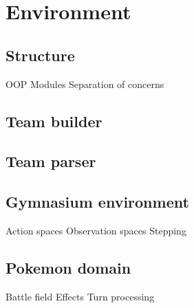 \section{Environment}
\label{sec:environment}

\subsection{Structure}
OOP
Modules
Separation of concerns

\subsection{Team builder}

\subsection{Team parser}

\subsection{Gymnasium environment}
Action spaces
Observation spaces
Stepping

\subsection{Pokemon domain}
Battle field
Effects
Turn processing